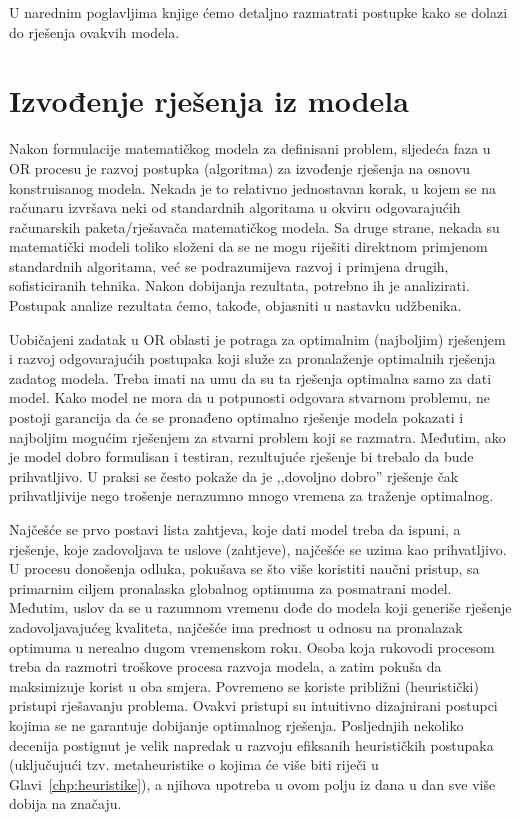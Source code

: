 \documentclass[b5paper, utf8, 11pt, colorlinks]{book}
\theoremstyle{definition}
\begin{document}
U narednim poglavljima knjige ćemo detaljno razmatrati postupke kako se dolazi do rješenja ovakvih modela.
 


\section{Izvođenje rješenja iz modela}


Nakon formulacije matematičkog modela za definisani problem, sljedeća faza u OR procesu  je razvoj postupka (algoritma) za
izvođenje rješenja na osnovu konstruisanog modela. Nekada je to relativno jednostavan korak, u kojem se na računaru izvršava neki od standardnih algoritama u okviru odgovarajućih računarskih paketa/rješavača matematičkog modela. Sa druge strane, nekada su matematički modeli toliko složeni da se ne mogu riješiti direktnom primjenom standardnih algoritama, već se podrazumijeva razvoj i primjena drugih, sofisticiranih tehnika.
Nakon dobijanja rezultata, potrebno ih je analizirati. Postupak analize rezultata ćemo, takođe, objasniti u nastavku udžbenika. 

Uobičajeni zadatak u OR oblasti je potraga za optimalnim (najboljim) rješenjem i razvoj odgovarajućih postupaka koji služe za pronala\-ženje optimalnih rješenja zadatog modela. Treba imati na umu da su ta rješenja optimalna samo za dati model. Kako model ne mora da u potpunosti odgovara stvarnom problemu, ne postoji garancija da će se pronađeno optimalno rješenje modela pokazati i najboljim mogućim rješenjem za stvarni problem koji se razmatra. Međutim, ako je
model dobro formulisan i testiran, rezultujuće rješenje  bi trebalo da bude prihvatljivo. U praksi se često pokaže da je ,,dovoljno dobro'' rješenje čak prihvatljivije nego trošenje nerazumno mnogo vremena za traženje optimalnog.    

Najčešće se prvo postavi lista zahtjeva, koje dati model treba da ispuni, a rješenje, koje zadovoljava te uslove (zahtjeve), najčešće se   uzima kao prihvatljivo. U procesu donošenja odluka, pokušava se što više  koristiti naučni pristup, sa primarnim ciljem pronalaska globalnog optimuma za posmatrani model. Međutim,  uslov da se u razumnom vremenu dođe do modela koji generiše rješenje  zadovoljavajućeg kvaliteta, najčešće ima prednost u odnosu na pronalazak optimuma u nerealno dugom vremenskom roku. Osoba koja rukovodi procesom treba da razmotri troškove procesa razvoja modela, a zatim
pokuša da maksimizuje korist u oba smjera. Povremeno se koriste   približni (heuristički) pristupi rješavanju problema. Ovakvi pristupi su intuitivno dizajnirani postupci kojima se ne garantuje dobijanje optimalnog rješenja. Posljednjih nekoliko decenija postignut je velik napredak u razvoju efiksanih heurističkih postupaka (uključujući tzv. metaheuristike o kojima će više biti riječi u Glavi~\ref{chp:heuristike}), a njihova upotreba u ovom polju iz dana u dan sve više dobija na značaju.  
\end{document}
